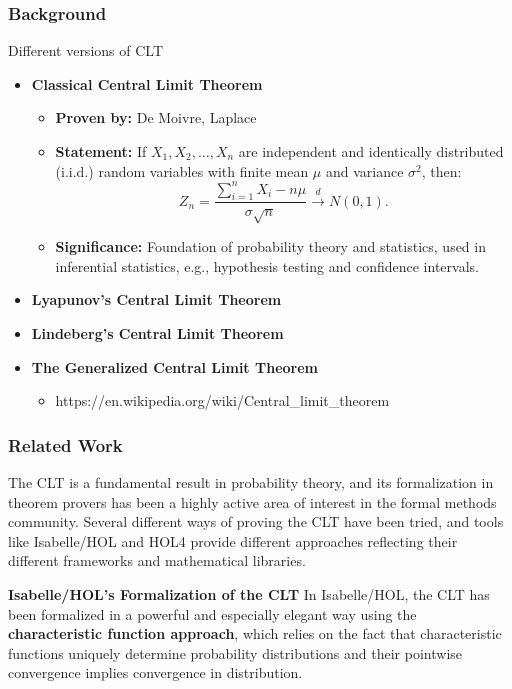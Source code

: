 \subsubsection{Background}
Different versions of CLT \cite{fischer2011history}
\begin{itemize}
    \item \textbf{Classical Central Limit Theorem} \cite{ross2019first}
    \begin{itemize}
        \item \textbf{Proven by:} De Moivre, Laplace
        \item \textbf{Statement:} If \( X_1, X_2, \ldots, X_n \) are independent and identically distributed (i.i.d.) random variables with finite mean \( \mu \) and variance \( \sigma^2 \), then:
  \[
  Z_n = \frac{\sum_{i=1}^n X_i - n\mu}{\sigma\sqrt{n} } \xrightarrow{d} N(0, 1).
  \]
  \item \textbf{Significance:} Foundation of probability theory and statistics, used in inferential statistics, e.g., hypothesis testing and confidence intervals.
    \end{itemize}

    \item \textbf{Lyapunov’s Central Limit Theorem} \cite{chung2000course}
    \item \textbf{Lindeberg’s Central Limit Theorem}
    \item \textbf{The Generalized Central Limit Theorem} 
    \begin{itemize}
        \item https://en.wikipedia.org/wiki/Central_limit_theorem
    \end{itemize}

\end{itemize}

\subsubsection{Related Work}
The CLT is a fundamental result in probability theory, and its formalization in theorem provers has been a highly active area of interest in the formal methods community. Several different ways of proving the CLT have been tried, and tools like Isabelle/HOL and HOL4 provide different approaches reflecting their different frameworks and mathematical libraries.

\textbf{Isabelle/HOL's Formalization of the CLT}
In Isabelle/HOL, the CLT has been formalized in a powerful and especially elegant way using the \textbf{characteristic function approach}, which relies on the fact that characteristic functions uniquely determine probability distributions and their pointwise convergence implies convergence in distribution.

